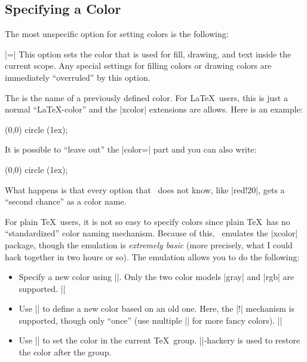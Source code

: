 \subsection{Specifying a Color}

The most unspecific option for setting colors is the following:

\begin{itemize}
  |=|%
  This option sets the color that is used for fill, drawing, and text
  inside the current scope. Any special settings for filling colors or
  drawing colors are immediately ``overruled'' by this option.

  The  is the name of a previously defined color. For
  \LaTeX\ users, this is just a normal ``\LaTeX-color'' and the
  |xcolor| extensions are allows. Here is an example:

\begin{codeexample}[]
\tikz \fill[color=red!20] (0,0) circle (1ex);
\end{codeexample}

  It is possible to ``leave out'' the |color=| part and you can also
  write:
\begin{codeexample}[]
\tikz \fill[red!20] (0,0) circle (1ex);
\end{codeexample}
  What happens is that every option that \tikzname\ does not know, like
  |red!20|, gets a ``second chance'' as a color name.

  For plain \TeX\ users, it is not so easy to specify colors since
  plain \TeX\ has no ``standardized'' color naming
  mechanism. Because of this, \pgfname\ emulates the |xcolor| package,
  though the emulation is \emph{extremely basic} (more precisely, what
  I could hack together in two hours or so). The emulation allows you
  to do the following:
  \begin{itemize}
  \item Specify a new color using |\definecolor|. Only the two color
    models |gray| and |rgb| are supported.
    \example ||
  \item Use || to define a new color based on an old
    one. Here, the |!| mechanism is supported, though only ``once''
    (use multiple || for more fancy colors).
    \example ||
  \item Use |\color| to set the color in the current
    \TeX\ group. |\aftergroup|-hackery is used to restore the color
    after the group.
  \end{itemize}
\end{itemize}

